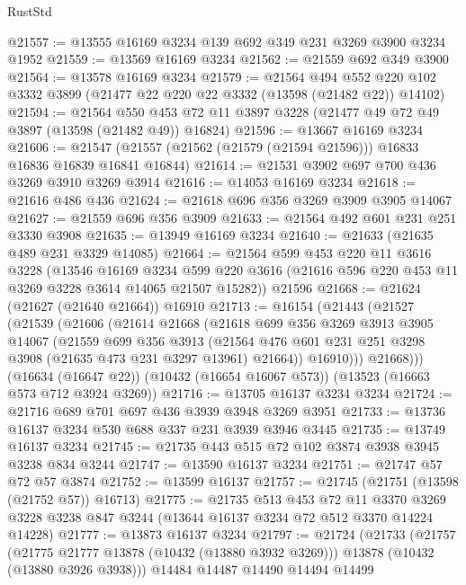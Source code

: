 \begin{lexlean}{RustStd}
\begin{coremodule}
@21557 := @13555 @16169 @3234 @139 @692 @349 @231 @3269 @3900 @3234 @1952
@21559 := @13569 @16169 @3234
@21562 := @21559 @692 @349 @3900
@21564 := @13578 @16169 @3234
@21579 := @21564
    @494
    @552
    @220
    @102
    @3332
    @3899
    (@21477 @22 @220 @22 @3332 (@13598 (@21482 @22)) @14102)
@21594 := @21564
    @550
    @453
    @72
    @11
    @3897
    @3228
    (@21477 @49 @72 @49 @3897 (@13598 (@21482 @49)) @16824)
@21596 := @13667 @16169 @3234
@21606 := @21547 (@21557 (@21562 (@21579 (@21594 @21596))) @16833 @16836 @16839 @16841 @16844)
@21614 := @21531 @3902 @697 @700 @436 @3269 @3910 @3269 @3914
@21616 := @14053 @16169 @3234
@21618 := @21616 @486 @436
@21624 := @21618 @696 @356 @3269 @3909 @3905 @14067
@21627 := @21559 @696 @356 @3909
@21633 := @21564 @492 @601 @231 @251 @3330 @3908
@21635 := @13949 @16169 @3234
@21640 := @21633 (@21635 @489 @231 @3329 @14085)
@21664 := @21564
    @599
    @453
    @220
    @11
    @3616
    @3228
    (@13546
      @16169
      @3234
      @599
      @220
      @3616
      (@21616 @596 @220 @453 @11 @3269 @3228 @3614 @14065 @21507 @15282))
    @21596
@21668 := @21624 (@21627 (@21640 @21664)) @16910
@21713 := @16154
    (@21443
      (@21527
        (@21539
          (@21606
            (@21614
              @21668
              (@21618
                @699
                @356
                @3269
                @3913
                @3905
                @14067
                (@21559
                  @699
                  @356
                  @3913
                  (@21564 @476 @601 @231 @251 @3298 @3908 (@21635 @473 @231 @3297 @13961) @21664))
                @16910)))
          @21668)))
    (@16634 (@16647 @22))
    (@10432 (@16654 @16067 @573))
    (@13523 (@16663 @573 @712 @3924 @3269))
@21716 := @13705 @16137 @3234 @3234
@21724 := @21716 @689 @701 @697 @436 @3939 @3948 @3269 @3951
@21733 := @13736 @16137 @3234 @530 @688 @337 @231 @3939 @3946 @3445
@21735 := @13749 @16137 @3234
@21745 := @21735 @443 @515 @72 @102 @3874 @3938 @3945 @3238 @834 @3244
@21747 := @13590 @16137 @3234
@21751 := @21747 @57 @72 @57 @3874
@21752 := @13599 @16137
@21757 := @21745 (@21751 (@13598 (@21752 @57)) @16713)
@21775 := @21735
    @513
    @453
    @72
    @11
    @3370
    @3269
    @3228
    @3238
    @847
    @3244
    (@13644 @16137 @3234 @72 @512 @3370 @14224 @14228)
@21777 := @13873 @16137 @3234
@21797 := @21724
    (@21733
      (@21757
        (@21775 @21777 @13878 (@10432 (@13880 @3932 @3269)))
        @13878
        (@10432 (@13880 @3926 @3938)))
      @14484
      @14487
      @14490
      @14494
      @14499

\end{coremodule}
\end{lexlean}
